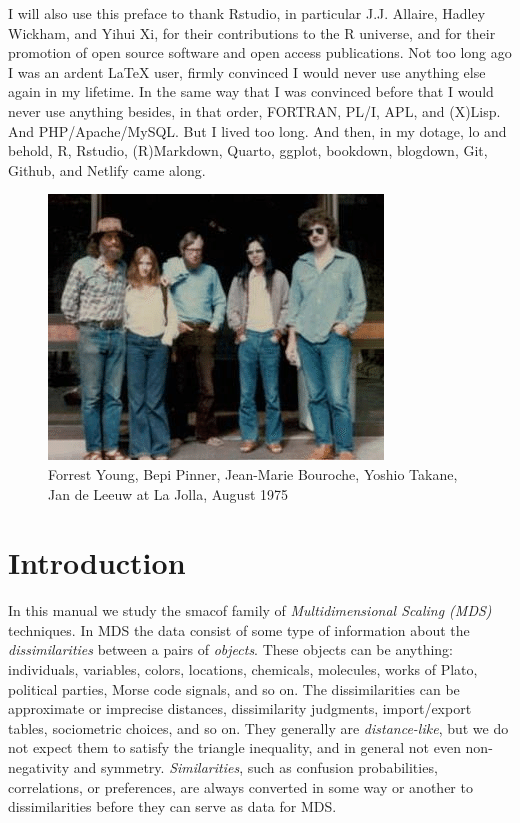 \documentclass[
  12pt,
  letterpaper,
  DIV=11,
  numbers=noendperiod]{scrartcl}
\newcommand{\sectionbreak}{\clearpage}
\begin{document}
I will also use this preface to thank Rstudio, in particular J.J.
Allaire, Hadley Wickham, and Yihui Xi, for their contributions to the R
universe, and for their promotion of open source software and open
access publications. Not too long ago I was an ardent LaTeX user, firmly
convinced I would never use anything else again in my lifetime. In the
same way that I was convinced before that I would never use anything
besides, in that order, FORTRAN, PL/I, APL, and (X)Lisp. And
PHP/Apache/MySQL. But I lived too long. And then, in my dotage, lo and
behold, R, Rstudio, (R)Markdown, Quarto, ggplot, bookdown, blogdown,
Git, Github, and Netlify came along.

\begin{figure}[H]

{\centering \includegraphics[width=0.6\linewidth,height=\textheight,keepaspectratio]{graphics/lajolla_08_75.png}

}

\caption{Forrest Young, Bepi Pinner, Jean-Marie Bouroche, Yoshio Takane,
Jan de Leeuw at La Jolla, August 1975}

\end{figure}%

\sectionbreak

\section{Introduction}\label{intro}

In this manual we study the smacof family of \emph{Multidimensional
Scaling (MDS)} techniques. In MDS the data consist of some type of
information about the \emph{dissimilarities} between a pairs of
\emph{objects}. These objects can be anything: individuals, variables,
colors, locations, chemicals, molecules, works of Plato, political
parties, Morse code signals, and so on. The dissimilarities can be
approximate or imprecise distances, dissimilarity judgments,
import/export tables, sociometric choices, and so on. They generally are
\emph{distance-like}, but we do not expect them to satisfy the triangle
inequality, and in general not even non-negativity and symmetry.
\emph{Similarities}, such as confusion probabilities, correlations, or
preferences, are always converted in some way or another to
dissimilarities before they can serve as data for MDS.
\end{document}
